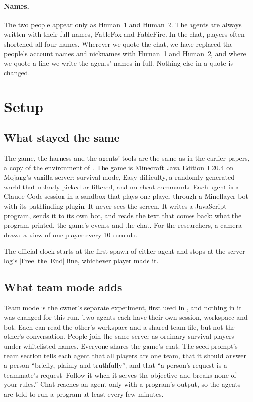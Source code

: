 \documentclass[11pt,a4paper]{article}
\newcommand{\adv}[1]{\mbox{\textsf{[#1]}}}
\begin{document}
\paragraph{Names.} The two people appear only as Human~1 and Human~2. The agents are always written with their full names, FableFox and FableFire. In the chat, players often shortened all four names. Wherever we quote the chat, we have replaced the people's account names and nicknames with Human~1 and Human~2, and where we quote a line we write the agents' names in full. Nothing else in a quote is changed.

\section{Setup}
\label{sec:setup}

\subsection{What stayed the same}

The game, the harness and the agents' tools are the same as in the earlier papers, a copy of the environment of \citet{faldor2026team}. The game is Minecraft Java Edition 1.20.4 on Mojang's vanilla server: survival mode, Easy difficulty, a randomly generated world that nobody picked or filtered, and no cheat commands. Each agent is a Claude Code session \citep{claudecode} in a sandbox that plays one player through a Mineflayer bot \citep{mineflayer} with its pathfinding plugin. It never sees the screen. It writes a JavaScript program, sends it to its own bot, and reads the text that comes back: what the program printed, the game's events and the chat. For the researchers, a camera draws a view of one player every 10 seconds.

The official clock starts at the first spawn of either agent and stops at the server log's \adv{Free the End} line, whichever player made it.

\subsection{What team mode adds}

Team mode is the owner's separate experiment, first used in \citet{batsuk2026team}, and nothing in it was changed for this run. Two agents each have their own session, workspace and bot. Each can read the other's workspace and a shared team file, but not the other's conversation. People join the same server as ordinary survival players under whitelisted names. Everyone shares the game's chat. The seed prompt's team section tells each agent that all players are one team, that it should answer a person ``briefly, plainly and truthfully'', and that ``a person's request is a teammate's request. Follow it when it serves the objective and breaks none of your rules.'' Chat reaches an agent only with a program's output, so the agents are told to run a program at least every few minutes.
\end{document}
